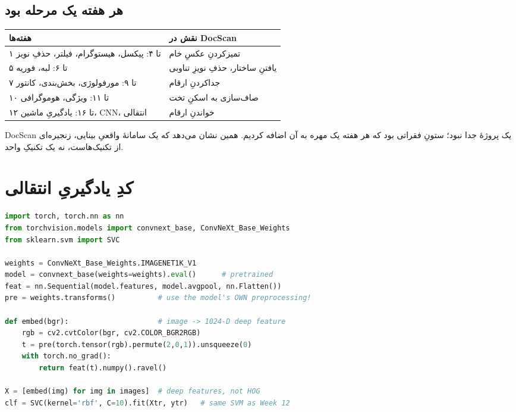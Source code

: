 \documentclass[12pt,a4paper]{article}
\begin{document}
\subsection{هر هفته یک مرحله بود}

\begin{center}
\begin{tabular}{@{}ll@{}}
\hline
\textbf{هفته‌ها} & \textbf{نقش در DocScan} \\
\hline
۱ تا ۴: پیکسل، هیستوگرام، فیلتر، حذفِ نویز & تمیزکردنِ عکسِ خام \\
۵ تا ۶: لبه، فوریه & یافتنِ ساختار، حذفِ نویزِ تناوبی \\
۷ تا ۹: مورفولوژی، بخش‌بندی، کانتور & جداکردنِ ارقام \\
۱۰ تا ۱۱: ویژگی، هوموگرافی & صاف‌سازی به اسکنِ تخت \\
۱۲ تا ۱۶: یادگیریِ ماشین، CNN، انتقالی & خواندنِ ارقام \\
\hline
\end{tabular}
\end{center}

\begin{yaddasht}
DocScan یک پروژهٔ جدا نبود؛ ستونِ فقراتی بود که هر هفته یک مهره به آن اضافه کردیم. همین نشان می‌دهد که یک سامانهٔ واقعیِ بینایی، زنجیره‌ای از تکنیک‌هاست، نه یک تکنیکِ واحد.
\end{yaddasht}

\section{کدِ یادگیریِ انتقالی}

\begin{ltrcode}
\begin{lstlisting}[language=Python]
import torch, torch.nn as nn
from torchvision.models import convnext_base, ConvNeXt_Base_Weights
from sklearn.svm import SVC

weights = ConvNeXt_Base_Weights.IMAGENET1K_V1
model = convnext_base(weights=weights).eval()      # pretrained
feat = nn.Sequential(model.features, model.avgpool, nn.Flatten())
pre = weights.transforms()          # use the model's OWN preprocessing!

def embed(bgr):                     # image -> 1024-D deep feature
    rgb = cv2.cvtColor(bgr, cv2.COLOR_BGR2RGB)
    t = pre(torch.tensor(rgb).permute(2,0,1)).unsqueeze(0)
    with torch.no_grad():
        return feat(t).numpy().ravel()

X = [embed(img) for img in images]  # deep features, not HOG
clf = SVC(kernel='rbf', C=10).fit(Xtr, ytr)   # same SVM as Week 12
\end{lstlisting}
\end{ltrcode}
\end{document}
